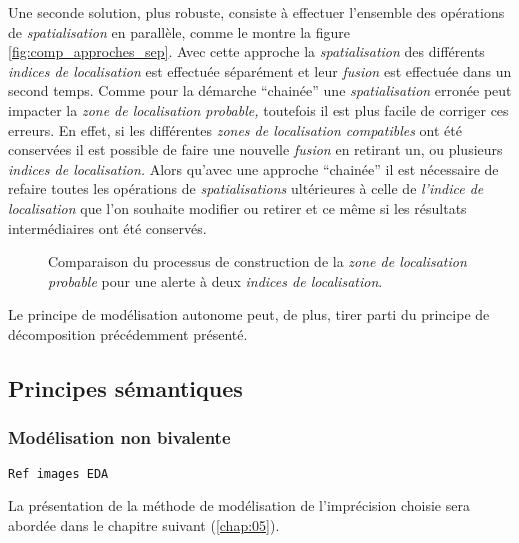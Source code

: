 Une seconde solution, plus robuste, consiste à effectuer l'ensemble
des opérations de \emph{spatialisation} en parallèle, comme le montre
la figure \ref{fig:comp_approches_sep}. Avec cette approche la
\emph{spatialisation} des différents \emph{indices de localisation}
est effectuée séparément et leur \emph{fusion} est effectuée dans un
second temps. Comme pour la démarche \enquote{chainée} une
\emph{spatialisation} erronée peut impacter la \emph{zone de
  localisation probable,} toutefois il est plus facile de corriger ces
erreurs. En effet, si les différentes \emph{zones de localisation
  compatibles} ont été conservées il est possible de faire une
nouvelle \emph{fusion} en retirant un, ou plusieurs \emph{indices de
  localisation.} Alors qu'avec une approche \enquote{chainée} il est
nécessaire de refaire toutes les opérations de \emph{spatialisations}
ultérieures à celle de \emph{l'indice de localisation} que l'on
souhaite modifier ou retirer et ce même si les résultats
intermédiaires ont été conservés.

\begin{figure}
  \centering

  \caption{Comparaison du processus de construction de la \emph{zone
      de localisation probable} pour une alerte à deux \emph{indices
      de localisation}.}
  \label{fig:comp_approches}
\end{figure}

Le principe de modélisation autonome peut, de plus, tirer parti du
principe de décomposition précédemment présenté.


\subsection{Principes sémantiques}

\subsubsection{Modélisation non bivalente}
\texttt{Ref images EDA}

La présentation de la méthode de modélisation de l'imprécision choisie
sera abordée dans le chapitre suivant (\autoref{chap:05}).

